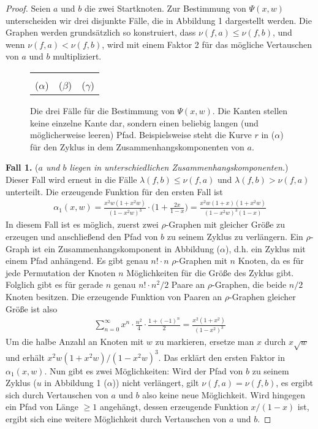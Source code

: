 \documentclass[a4paper, 10pt, ngerman]{article}
\begin{document}
\begin{proof}
    Seien $a$ und $b$ die zwei Startknoten. Zur Bestimmung von $\Psi(x, w)$ unterscheiden wir drei disjunkte Fälle, die in Abbildung 1 dargestellt werden. Die Graphen werden grundsätzlich so konstruiert, dass $\nu(f, a) \le \nu(f, b)$, und wenn $\nu(f, a) < \nu(f, b)$, wird mit einem Faktor 2 für das mögliche Vertauschen von $a$ und $b$ multipliziert.

    \begin{figure}
        \begin{tabular}{ccc}
             &  &  \\
            ($\alpha$)                           & ($\beta$)                           & ($\gamma$)
        \end{tabular}
        \caption{Die drei Fälle für die Bestimmung von $\Psi(x, w)$. Die Kanten stellen keine einzelne Kante dar, sondern einen beliebig langen (und möglicherweise leeren) Pfad. Beispielsweise steht die Kurve $r$ in ($\alpha$) für den Zyklus in dem Zusammenhangskomponenten von $a$.}
    \end{figure}

    \textbf{Fall 1.} (\emph{$a$ und $b$ liegen in unterschiedlichen Zusammenhangskomponenten.}) Dieser Fall wird erneut in die Fälle $\lambda(f, b) \le \nu(f, a)$ und $\lambda(f, b) > \nu(f, a)$ unterteilt. Die erzeugende Funktion für den ersten Fall ist
    \begin{align*}
        \alpha_1(x, w) = \frac {x^2w(1 + x^2w)} {(1 - x^2w)^3} \cdot \Bigg (1 + \frac {2x} {1 - x} \Bigg ) = \frac {x^2w(1 + x)(1 + x^2w)} {(1 - x^2w)^3(1 - x)}
    \end{align*}
    In diesem Fall ist es möglich, zuerst zwei $\rho$-Graphen mit gleicher Größe zu erzeugen und anschließend den Pfad von $b$ zu seinem Zyklus zu verlängern. Ein $\rho$-Graph ist ein Zusammenhangskomponent in Abbildung ($\alpha$), d.h. ein Zyklus mit einem Pfad anhängend. Es gibt genau $n! \cdot n$ $\rho$-Graphen mit $n$ Knoten, da es für jede Permutation der Knoten $n$ Möglichkeiten für die Größe des Zyklus gibt. Folglich gibt es für gerade $n$ genau $n! \cdot n^2/2$ Paare an $\rho$-Graphen, die beide $n/2$ Knoten besitzen. Die erzeugende Funktion von Paaren an $\rho$-Graphen gleicher Größe ist also
    \begin{align*}
        \sum_{n = 0}^\infty x^n \cdot \frac {n^2} 4 \cdot \frac {1 + (-1)^n} 2 = \frac {x^2(1 + x^2)} {(1 - x^2)^3}
    \end{align*}
    Um die halbe Anzahl an Knoten mit $w$ zu markieren, ersetze man $x$ durch $x \sqrt w$ und erhält $x^2w(1 + x^2w) / (1 - x^2w)^3$. Das erklärt den ersten Faktor in $\alpha_1(x, w)$. Nun gibt es zwei Möglichkeiten: Wird der Pfad von $b$ zu seinem Zyklus ($u$ in Abbildung 1 ($\alpha$)) nicht verlängert, gilt $\nu(f, a) = \nu(f, b)$, es ergibt sich durch Vertauschen von $a$ und $b$ also keine neue Möglichkeit. Wird hingegen ein Pfad von Länge $\ge 1$ angehängt, dessen erzeugende Funktion $x/(1 - x)$ ist, ergibt sich eine weitere Möglichkeit durch Vertauschen von $a$ und $b$.


\end{proof}
\end{document}
